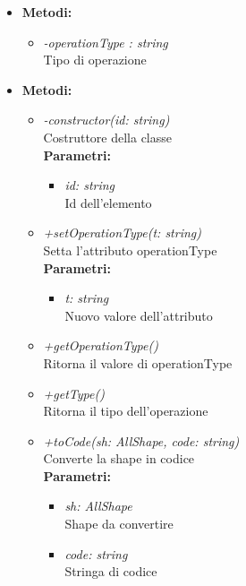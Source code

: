 \begin{itemize}
	\item \textbf{Metodi:}
		\begin{itemize}
			\item \emph{-operationType : string}\\
    		Tipo di operazione
		\end{itemize}
	\item \textbf{Metodi:}
		\begin{itemize}
			\item \emph{-constructor(id: string)}\\
    		Costruttore della classe\\
    		\textbf{Parametri:}
    		\begin{itemize}
    			\item \emph{id: string}\\
    			Id dell'elemento
    		\end{itemize}
    		\item \emph{+setOperationType(t: string)}\\
    		Setta l'attributo operationType\\
    		\textbf{Parametri:}
    		\begin{itemize}
    			\item \emph{t: string}\\
    			Nuovo valore dell'attributo
    		\end{itemize}
    		\item \emph{+getOperationType()}\\
    		Ritorna il valore di operationType
    		\item \emph{+getType()}\\
    		Ritorna il tipo dell'operazione
    		\item \emph{+toCode(sh: AllShape, code: string)}\\
    		Converte la shape in codice\\
    		\textbf{Parametri:}
    		\begin{itemize}
    			\item \emph{sh: AllShape}\\
    			Shape da convertire
    			\item \emph{code: string}\\
    			Stringa di codice
    		\end{itemize}
    	\end{itemize}
\end{itemize}